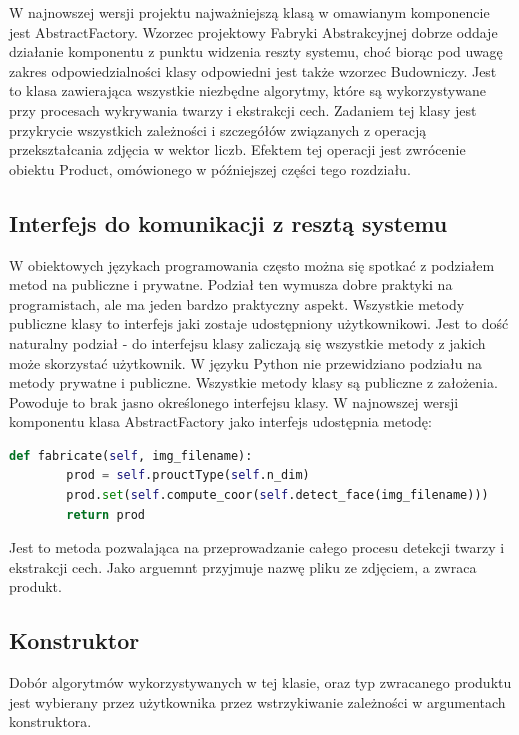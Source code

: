 \documentclass[oneside, eng]{mgr}
\begin{document}
W najnowszej wersji projektu najważniejszą klasą w omawianym komponencie jest AbstractFactory. Wzorzec projektowy Fabryki Abstrakcyjnej dobrze oddaje działanie komponentu z punktu widzenia reszty systemu, choć biorąc pod uwagę zakres odpowiedzialności klasy odpowiedni jest także wzorzec Budowniczy. Jest to klasa zawierająca wszystkie niezbędne algorytmy, które są wykorzystywane przy procesach wykrywania twarzy i ekstrakcji cech. Zadaniem tej klasy jest przykrycie wszystkich zależności i szczegółów związanych z operacją przekształcania zdjęcia w wektor liczb. Efektem tej operacji jest zwrócenie obiektu Product, omówionego w późniejszej części tego rozdziału.

\subsection{Interfejs do komunikacji z resztą systemu}

W obiektowych językach programowania często można się spotkać z podziałem metod na publiczne i prywatne. Podział ten wymusza dobre praktyki na programistach, ale ma jeden bardzo praktyczny aspekt. Wszystkie metody publiczne klasy to interfejs jaki zostaje udostępniony użytkownikowi. Jest to dość naturalny podział - do interfejsu klasy zaliczają się wszystkie metody z jakich może skorzystać użytkownik. W języku Python nie przewidziano podziału na metody prywatne i publiczne. Wszystkie metody klasy są publiczne z założenia. Powoduje to brak jasno określonego interfejsu klasy. W najnowszej wersji komponentu klasa AbstractFactory jako interfejs udostępnia metodę:

\begin{lstlisting}[language=Python]
    def fabricate(self, img_filename):
        prod = self.prouctType(self.n_dim)
        prod.set(self.compute_coor(self.detect_face(img_filename)))
        return prod
\end{lstlisting}

Jest to metoda pozwalająca na przeprowadzanie całego procesu detekcji twarzy i ekstrakcji cech. Jako arguemnt przyjmuje nazwę pliku ze zdjęciem, a zwraca produkt.

\subsection{Konstruktor}

Dobór algorytmów wykorzystywanych w tej klasie, oraz typ zwracanego produktu jest wybierany przez użytkownika przez wstrzykiwanie zależności w argumentach konstruktora.
\end{document}
